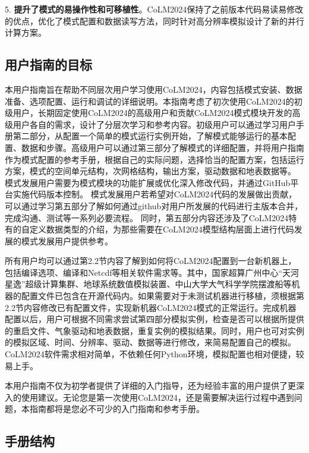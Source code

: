 5. \textbf{提升了模式的易操作性和可移植性}。CoLM2024保持了之前版本代码易读易修改的优点，优化了模式配置和数据读写方法，同时针对高分辨率模拟设计了新的并行计算方案。

\subsection{用户指南的目标}

本用户指南旨在帮助不同层次用户学习使用CoLM2024，内容包括模式安装、数据准备、选项配置、运行和调试的详细说明。本指南考虑了初次使用CoLM2024的初级用户，长期固定使用CoLM2024的高级用户和贡献CoLM2024模式模块开发的高级用户各自的需求，设计了分层次学习和参考内容。初级用户可以通过学习用户手册第二部分，从配置一个简单的模式运行实例开始，了解模式能够运行的基本配置、数据和步骤。高级用户可以通过第三部分了解模式的详细配置，并将用户指南作为模式配置的参考手册，根据自己的实际问题，选择恰当的配置方案，包括运行方案，模式的空间单元结构，次网格结构，输出方案，驱动数据和地表数据等。%
模式发展用户需要为模式模块的功能扩展或优化深入修改代码，并通过GitHub平台实施代码版本控制。
模式发展用户若希望对CoLM2024代码的发展做出贡献，可以通过学习第五部分了解如何通过github对用户所发展的代码进行主版本合并，完成沟通、测试等一系列必要流程。
同时，第五部分内容还涉及了CoLM2024特有的自定义数据类型的介绍，为那些需要在CoLM2024模型结构层面上进行代码发展的模式发展用户提供参考。

所有用户均可以通过第2.2节内容了解到如何将CoLM2024配置到一台新机器上，包括编译选项、编译和Netcdf等相关软件需求等。其中，国家超算广州中心“天河星逸”超级计算集群、地球系统数值模拟装置、中山大学大气科学学院摆渡船等机器的配置文件已包含在开源代码内。如果需要对于未测试机器进行移植，须根据第2.2节内容修改已有配置文件，实现新机器CoLM2024模式的正常运行。完成机器配置以后，用户可根据不同需求尝试第四部分模拟实例，检查是否可以根据所提供的重启文件、气象驱动和地表数据，重复实例的模拟结果。同时，用户也可对实例的模拟区域、时间、分辨率、驱动、数据等进行修改，来简易配置自己的模拟。CoLM2024软件需求相对简单，不依赖任何Python环境，模拟配置也相对便捷，较易上手。

本用户指南不仅为初学者提供了详细的入门指导，还为经验丰富的用户提供了更深入的使用建议。无论您是第一次使用CoLM2024，还是需要解决运行过程中遇到问题，本指南都将是您必不可少的入门指南和参考手册。


\subsection{手册结构}

